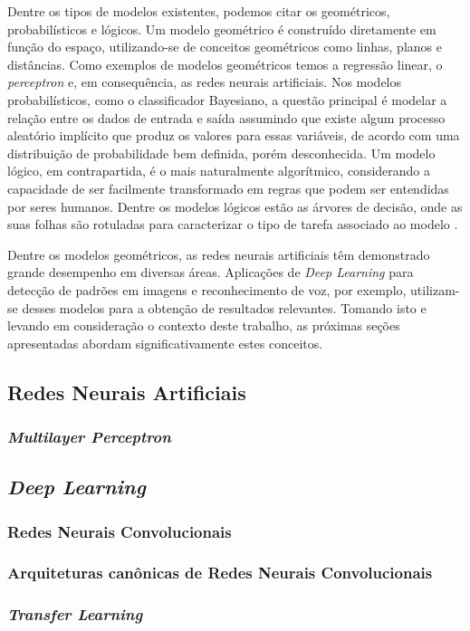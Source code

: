 Dentre os tipos de modelos existentes, podemos citar os geométricos, probabilísticos e lógicos. Um modelo geométrico é construído diretamente em função do espaço, utilizando-se de conceitos geométricos como linhas, planos e distâncias. Como exemplos de modelos geométricos temos a regressão linear, o \emph{perceptron} e, em consequência, as redes neurais artificiais. Nos modelos probabilísticos, como o classificador Bayesiano, a questão principal é modelar a relação entre os dados de entrada e saída assumindo que existe algum processo aleatório implícito que produz os valores para essas variáveis, de acordo com uma distribuição de probabilidade bem definida, porém desconhecida. Um modelo lógico, em contrapartida, é o mais naturalmente algorítmico, considerando a capacidade de ser facilmente transformado em regras que podem ser entendidas por seres humanos. Dentre os modelos lógicos estão as árvores de decisão, onde as suas folhas são rotuladas para caracterizar o tipo de tarefa associado ao modelo \cite{flach}.

Dentre os modelos geométricos, as redes neurais artificiais têm demonstrado grande desempenho em diversas áreas. Aplicações de \emph{Deep Learning} para detecção de padrões em imagens e reconhecimento de voz, por exemplo, utilizam-se desses modelos para a obtenção de resultados relevantes. Tomando isto e levando em consideração o contexto deste trabalho, as próximas seções apresentadas abordam significativamente estes conceitos.


\subsection{Redes Neurais Artificiais}
\label{subsec:rna}

\subsubsection{\emph{Multilayer Perceptron}}
\label{subsubsec:mlp}


\subsection{\emph{Deep Learning}}
\label{subsec:dl}

\subsubsection{Redes Neurais Convolucionais}
\label{subsubsec:cnns}

\subsubsection{Arquiteturas canônicas de Redes Neurais Convolucionais}
\label{subsubsec:arq-cnns}

\subsubsection{\emph{Transfer Learning}}
\label{subsubsec:transfer}